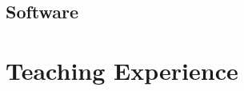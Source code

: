 \documentclass[10pt, letterpaper]{article}
\begin{document}
\subsection{Software}
\begin{refsection}


  
  
\end{refsection}




\section{Teaching Experience}
\end{document}
